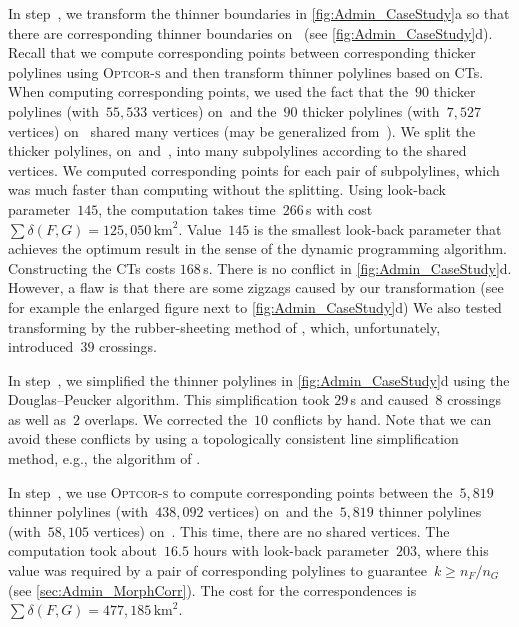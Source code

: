 In step~, we transform the thinner boundaries in 
\fig\ref{fig:Admin_CaseStudy}a
so that there are corresponding thinner boundaries on~\ms
(see \fig\ref{fig:Admin_CaseStudy}d).
Recall that we compute corresponding points between 
corresponding thicker polylines using \textsc{Optcor-s}
and then transform thinner polylines based on CTs.
When computing corresponding points, 
we used the fact that the~$90$ thicker polylines 
(with~$55{,}533$ vertices) on~\ml and 
the~$90$ thicker polylines (with~$7{,}527$ vertices) on~\ms 
shared many vertices (\ms may be generalized from~\ml).
We split the thicker polylines, on~\ml and~\ms, 
into many subpolylines according to the shared vertices. 
We computed corresponding points for each pair of subpolylines, 
which was much faster than computing without the splitting. 
Using look-back parameter~$145$, 
the computation takes time~$266\,$s 
with cost~$\sum \delta(F,G)=125{,}050\,\mathrm{km}^2$. 
Value~$145$ is the smallest look-back parameter
that achieves the optimum result in
the sense of the dynamic programming algorithm. 
Constructing the CTs costs $168\,$s. 
There is no conflict  in
\fig\ref{fig:Admin_CaseStudy}d. 
However, a flaw is that there are some zigzags 
caused by our transformation
(see for example the enlarged figure next to 
\fig\ref{fig:Admin_CaseStudy}d)
%
We also tested transforming by the rubber-sheeting method of 
\textcite{Doytsher2001}, 
which, unfortunately, introduced~$39$ crossings. 

In step~, we simplified the thinner polylines 
in \fig\ref{fig:Admin_CaseStudy}d
using the Douglas--Peucker algorithm. 
This simplification took $29\,$s 
and caused~$8$ crossings as well as~$2$ overlaps. 
We corrected the~$10$ conflicts by hand. 
Note that we can avoid these conflicts by using
a topologically consistent line simplification method, 
e.g., the algorithm of \textcite{Saalfeld1999}.

In step~, we use \mbox{\textsc{Optcor-s}} 
to compute corresponding points between 
the~$5{,}819$ thinner polylines 
(with~$438{,}092$ vertices) on~\ml and 
the~$5{,}819$ thinner polylines 
(with~$58{,}105$ vertices) on~\ms.
This time, there are no shared vertices.
The computation took about~$16.5$ hours 
with look-back parameter~$203$, 
where this value was required by 
a pair of corresponding polylines 
to guarantee~$k \geq n_F/n_G$ 
(see \sect\ref{sec:Admin_MorphCorr}).
The cost for the correspondences 
is~$\sum \delta(F,G)=477{,}185\,\mathrm{km}^2$.

